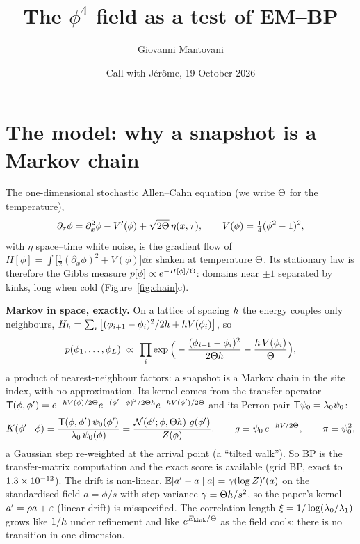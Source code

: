 \documentclass[11pt,a4paper]{article}
\title{\textbf{The $\phi^4$ field as a test of EM--BP}}
\author{Giovanni Mantovani}
\date{Call with Jérôme, 19 October 2026}
\begin{document}
\maketitle
\vspace{-1.5em}

\section{The model: why a snapshot is a Markov chain}
\label{sec:model}

The one-dimensional stochastic Allen--Cahn equation (we write $\Theta$ for the temperature),
\[
\partial_\tau\phi=\partial_x^2\phi-V'(\phi)+\sqrt{2\Theta}\,\eta(x,\tau),\qquad V(\phi)=\tfrac14(\phi^2-1)^2,
\]
with $\eta$ space--time white noise, is the gradient flow of $H[\phi]=\int\big[\tfrac12(\partial_x\phi)^2+V(\phi)\big]\dd x$ shaken
at temperature $\Theta$. Its stationary law is therefore the Gibbs measure $p[\phi]\propto e^{-H[\phi]/\Theta}$: domains near
$\pm1$ separated by kinks, long when cold (Figure~\ref{fig:chain}c).

\textbf{Markov in space, exactly.} On a lattice of spacing $h$ the energy couples only neighbours,
$H_h=\sum_i\big[(\phi_{i+1}-\phi_i)^2/2h+h V(\phi_i)\big]$, so
\[
p(\phi_1,\dots,\phi_L)\;\propto\;\prod_i\exp\Big(-\frac{(\phi_{i+1}-\phi_i)^2}{2\Theta h}-\frac{h\,V(\phi_i)}{\Theta}\Big),
\]
a product of nearest-neighbour factors: a snapshot is a Markov chain in the site index, with no approximation. Its kernel
comes from the transfer operator $\mathsf{T}(\phi,\phi')=e^{-h V(\phi)/2\Theta}e^{-(\phi'-\phi)^2/2\Theta h}e^{-h V(\phi')/2\Theta}$
and its Perron pair $\mathsf{T}\psi_0=\lambda_0\psi_0$:
\[
K(\phi'\mid\phi)=\frac{\mathsf{T}(\phi,\phi')\,\psi_0(\phi')}{\lambda_0\,\psi_0(\phi)}
=\frac{\mathcal{N}\!\left(\phi';\phi,\Theta h\right)\,g(\phi')}{Z(\phi)},\qquad g=\psi_0\,e^{-h V/2\Theta},\qquad \pi=\psi_0^2 ,
\]
a Gaussian step re-weighted at the arrival point (a ``tilted walk''). So BP is the transfer-matrix computation and the exact
score is available (grid BP, exact to $1.3\times10^{-12}$). The drift is non-linear, $\mathbb{E}[a'-a\mid a]=\gamma(\log Z)'(a)$ on
the standardised field $a=\phi/s$ with step variance $\gamma=\Theta h/s^2$, so the paper's kernel $a'=\rho a+\varepsilon$
(linear drift) is misspecified. The correlation length $\xi=1/\log(\lambda_0/\lambda_1)$ grows like $1/h$ under refinement
and like $e^{E_{\mathrm{kink}}/\Theta}$ as the field cools; there is no transition in one dimension.
\end{document}
